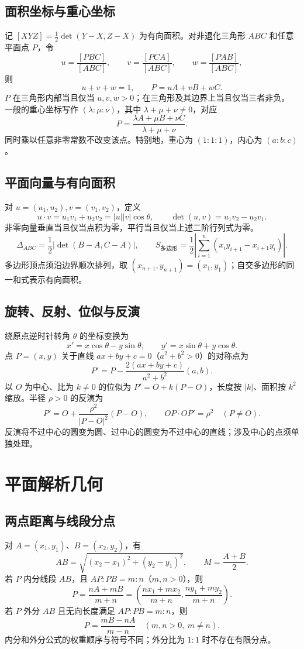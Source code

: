 \documentclass[../main.tex]{subfiles}
\begin{document}
\subsection{面积坐标与重心坐标}
记 $[XYZ]=\tfrac12\det(Y-X,Z-X)$ 为有向面积。对非退化三角形 $ABC$ 和任意平面点 $P$，令
\[
u=\frac{[PBC]}{[ABC]},\qquad
v=\frac{[PCA]}{[ABC]},\qquad
w=\frac{[PAB]}{[ABC]},
\]
则
\[
u+v+w=1,\qquad P=uA+vB+wC.
\]
$P$ 在三角形内部当且仅当 $u,v,w>0$；在三角形及其边界上当且仅当三者非负。
一般的重心坐标写作 $(\lambda:\mu:\nu)$，其中 $\lambda+\mu+\nu\ne0$，对应
\[
P=\frac{\lambda A+\mu B+\nu C}{\lambda+\mu+\nu}.
\]
同时乘以任意非零常数不改变该点。特别地，重心为 $(1:1:1)$，内心为 $(a:b:c)$。
\subsection{平面向量与有向面积}
对 $u=(u_1,u_2),v=(v_1,v_2)$，定义
\[
u\cdot v=u_1v_1+u_2v_2=|u||v|\cos\theta,\qquad
\det(u,v)=u_1v_2-u_2v_1.
\]
非零向量垂直当且仅当点积为零，平行当且仅当上述二阶行列式为零。
\[
\Delta_{ABC}=\frac12|\det(B-A,C-A)|,\qquad
S_{\text{多边形}}=\frac12\left|\sum_{i=1}^n(x_iy_{i+1}-x_{i+1}y_i)\right|.
\]
多边形顶点须沿边界顺次排列，取 $(x_{n+1},y_{n+1})=(x_1,y_1)$；自交多边形的同一和式表示有向面积。
\subsection{旋转、反射、位似与反演}
绕原点逆时针转角 $\theta$ 的坐标变换为
\[
x'=x\cos\theta-y\sin\theta,\qquad y'=x\sin\theta+y\cos\theta.
\]
点 $P=(x,y)$ 关于直线 $ax+by+c=0$（$a^2+b^2>0$）的对称点为
\[
P'=P-\frac{2(ax+by+c)}{a^2+b^2}(a,b).
\]
以 $O$ 为中心、比为 $k\ne0$ 的位似为 $P'=O+k(P-O)$，长度按 $|k|$、面积按 $k^2$ 缩放。半径 $\rho>0$ 的反演为
\[
P'=O+\frac{\rho^2}{|P-O|^2}(P-O),\qquad OP\cdot OP'=\rho^2\quad(P\ne O).
\]
反演将不过中心的圆变为圆、过中心的圆变为不过中心的直线；涉及中心的点须单独处理。
\section{平面解析几何}
\subsection{两点距离与线段分点}
对 $A=(x_1,y_1)$、$B=(x_2,y_2)$，有
\[
AB=\sqrt{(x_2-x_1)^2+(y_2-y_1)^2},\qquad
M=\frac{A+B}{2}.
\]
若 $P$ 内分线段 $AB$，且 $AP:PB=m:n$（$m,n>0$），则
\[
P=\frac{nA+mB}{m+n}
=\left(\frac{nx_1+mx_2}{m+n},\frac{ny_1+my_2}{m+n}\right).
\]
若 $P$ 外分 $AB$ 且无向长度满足 $AP:PB=m:n$，则
\[
P=\frac{mB-nA}{m-n}\quad(m,n>0,\ m\ne n).
\]
内分和外分公式的权重顺序与符号不同；外分比为 $1:1$ 时不存在有限分点。
\end{document}
